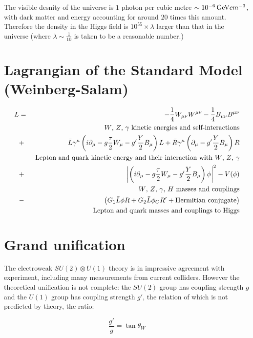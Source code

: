 The visible desnity of the universe is $1$ photon per cubic metre $\sim 10^{-6} \mathrm{\,GeV} cm^{-3}$, with dark matter and energy accounting for around $20$ times this amount.  Therefore the density in the Higgs field is $10^{55} \times \lambda$ larger than that in the universe (where $\lambda \sim \frac{1}{10}$ is taken to be a reasonable number.)

\section{Lagrangian of the Standard Model (Weinberg-Salam)}

\begin{eqnarray*}
  L & = & -\frac{1}{4}W_{\mu\nu}W^{\mu\nu} - \frac{1}{4}B_{\mu\nu}B^{\mu\nu} \\ \nopagebreak
    &   & \textrm{ $W$, $Z$, $\gamma$ kinetic energies and self-interactions} \\\nopagebreak
    & + & \bar{L}\gamma^{\mu}\left(i\partial_{\mu}-g\frac{\tau}{2}W_{\mu}-g'\frac{Y}{2}B_{\mu}\right)L + \bar{R}\gamma^{\mu}\left(\partial_{\mu} - g'\frac{Y}{2}B_{\mu}\right)R \\\nopagebreak
    &   & \textrm{ Lepton and quark kinetic energy and their interaction with $W$, $Z$, $\gamma$} \\\nopagebreak
    & + & \left|\left(i\partial_{\mu}-g\frac{\tau}{2}W_{\mu}-g'\frac{Y}{2}B_{\mu}\right)\phi\right|^2 - V(\phi) \\\nopagebreak
    &   & \textrm{ $W$, $Z$, $\gamma$, $H$ masses and couplings} \\\nopagebreak
    & - & \left(G_1 \bar{L}\phi R + G_2 \bar{L}\phi_C R' + \textrm{Hermitian conjugate}\right) \\\nopagebreak
    &   & \textrm{ Lepton and quark masses and couplings to Higgs}
\end{eqnarray*}

\section{Grand unification}

The electroweak $SU(2) \otimes U(1)$ theory is in impressive agreement with experiment, including many measurements from current colliders.  However the theoretical unification is not complete: the $SU(2)$ group has coupling strength $g$ and the $U(1)$ group has coupling strength $g'$, the relation of which is not predicted by theory, the ratio:

\[
  \frac{g'}{g} = \tan\theta_W
\]


